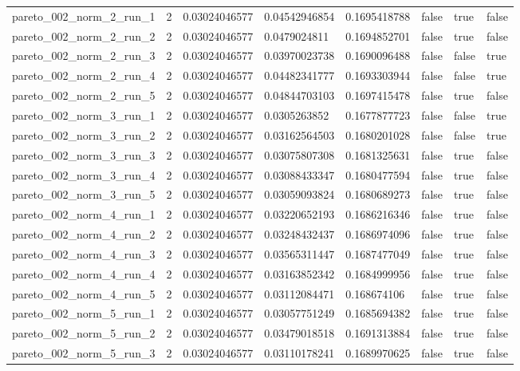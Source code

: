 \begin{tabular}{@{}llllllll@{}}
pareto\_002\_norm\_2\_run\_1 & 2 & 0.03024046577 & 0.04542946854 & 0.1695418788 & false & true & false \\
pareto\_002\_norm\_2\_run\_2 & 2 & 0.03024046577 & 0.0479024811 & 0.1694852701 & false & true & false \\
pareto\_002\_norm\_2\_run\_3 & 2 & 0.03024046577 & 0.03970023738 & 0.1690096488 & false & false & true \\
pareto\_002\_norm\_2\_run\_4 & 2 & 0.03024046577 & 0.04482341777 & 0.1693303944 & false & false & true \\
pareto\_002\_norm\_2\_run\_5 & 2 & 0.03024046577 & 0.04844703103 & 0.1697415478 & false & true & false \\
pareto\_002\_norm\_3\_run\_1 & 2 & 0.03024046577 & 0.0305263852 & 0.1677877723 & false & false & true \\
pareto\_002\_norm\_3\_run\_2 & 2 & 0.03024046577 & 0.03162564503 & 0.1680201028 & false & false & true \\
pareto\_002\_norm\_3\_run\_3 & 2 & 0.03024046577 & 0.03075807308 & 0.1681325631 & false & true & false \\
pareto\_002\_norm\_3\_run\_4 & 2 & 0.03024046577 & 0.03088433347 & 0.1680477594 & false & true & false \\
pareto\_002\_norm\_3\_run\_5 & 2 & 0.03024046577 & 0.03059093824 & 0.1680689273 & false & true & false \\
pareto\_002\_norm\_4\_run\_1 & 2 & 0.03024046577 & 0.03220652193 & 0.1686216346 & false & true & false \\
pareto\_002\_norm\_4\_run\_2 & 2 & 0.03024046577 & 0.03248432437 & 0.1686974096 & false & true & false \\
pareto\_002\_norm\_4\_run\_3 & 2 & 0.03024046577 & 0.03565311447 & 0.1687477049 & false & true & false \\
pareto\_002\_norm\_4\_run\_4 & 2 & 0.03024046577 & 0.03163852342 & 0.1684999956 & false & true & false \\
pareto\_002\_norm\_4\_run\_5 & 2 & 0.03024046577 & 0.03112084471 & 0.168674106 & false & true & false \\
pareto\_002\_norm\_5\_run\_1 & 2 & 0.03024046577 & 0.03057751249 & 0.1685694382 & false & true & false \\
pareto\_002\_norm\_5\_run\_2 & 2 & 0.03024046577 & 0.03479018518 & 0.1691313884 & false & true & false \\
pareto\_002\_norm\_5\_run\_3 & 2 & 0.03024046577 & 0.03110178241 & 0.1689970625 & false & true & false \\

\end{tabular}
